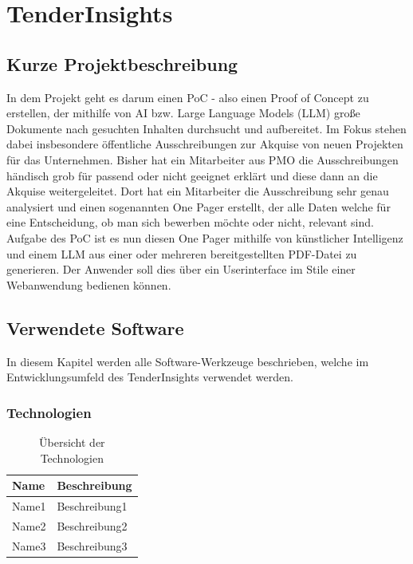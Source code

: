 \chapter{TenderInsights}

\section{Kurze Projektbeschreibung}
In dem Projekt geht es darum einen PoC - also einen Proof of Concept zu erstellen, der mithilfe von AI bzw. Large Language 
Models (LLM) große Dokumente nach gesuchten Inhalten durchsucht und aufbereitet. Im Fokus stehen dabei insbesondere 
öffentliche Ausschreibungen zur Akquise von neuen Projekten für das Unternehmen. Bisher hat ein Mitarbeiter aus PMO die 
Ausschreibungen händisch grob für passend oder nicht geeignet erklärt und diese dann an die Akquise weitergeleitet. 
Dort hat ein Mitarbeiter die Ausschreibung sehr genau analysiert und einen sogenannten One Pager erstellt, der alle 
Daten welche für eine Entscheidung, ob man sich bewerben möchte oder nicht, relevant sind. Aufgabe des PoC ist es nun 
diesen One Pager mithilfe von künstlicher Intelligenz und einem LLM aus einer oder mehreren bereitgestellten PDF-Datei zu 
generieren. Der Anwender soll dies über ein Userinterface im Stile einer Webanwendung bedienen können.

\section{Verwendete Software}
In diesem Kapitel werden alle Software-Werkzeuge beschrieben, welche im Entwicklungsumfeld des TenderInsights verwendet werden.


\subsection{Technologien}

\begin{table}[H]
    \centering
    \caption{Übersicht der Technologien}
    \label{tab:technologien}
    \begin{tabular}{|l|l|}
    \hline
    \textbf{Name} & \textbf{Beschreibung} \\ \hline
    Name1 & Beschreibung1 \\ \hline
    Name2 & Beschreibung2 \\ \hline
    Name3 & Beschreibung3 \\ \hline
    \end{tabular}
\end{table}


